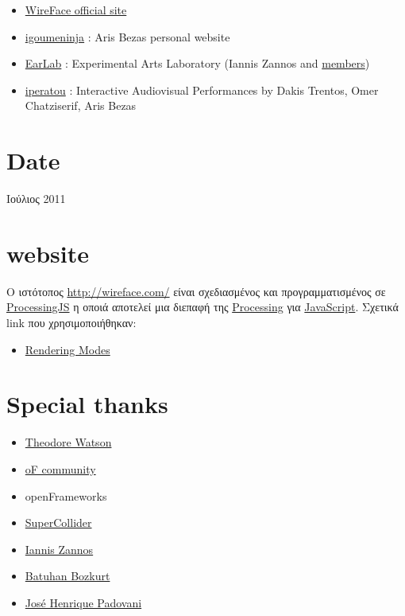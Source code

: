 \documentclass[11pt, a4paper]{scrartcl}
\begin{document}
\begin{itemize}
\item \href{http://wireface.com/}{WireFace official site}
\item \href{http://igoumeninja.org/}{igoumeninja} : Aris Bezas personal website
\item \href{http://earlab.org/}{EarLab} : Experimental Arts Laboratory (Iannis Zannos and \href{http://earlab.org/pmwiki.php?n=Members/HomePage}{members})
\item \href{http://iperatou.com/}{iperatou} : Interactive Audiovisual Performances by Dakis Trentos, Omer Chatziserif, Aris Bezas
\end{itemize}
\section{Date}
\label{sec-5}

Ιούλιος 2011
\section{website}
\label{sec-6}

Ο ιστότοπος \href{http://wireface.com/}{http://wireface.com/} είναι σχεδιασμένος και προγραμματισμένος σε \href{http://processingjs.org/}{ProcessingJS} η οποιά αποτελεί μια διεπαφή της \href{http://processing.org/}{Processing} για \href{http://en.wikipedia.org/wiki/JavaScript}{JavaScript}. 
Σχετικά link που χρησιμοποιήθηκαν:
\begin{itemize}
\item \href{http://processingjs.org/reference/articles/RenderingModes}{Rendering Modes}
\end{itemize}
\section{Special thanks}
\label{sec-7}

\begin{itemize}
\item \href{https://github.com/ofTheo/ofxKinect}{Theodore Watson}
\item \href{http://forum.openframeworks.cc/index.php?topic=4947.0}{oF community}
\item openFrameworks
\item \href{http://supercolliderbook.net/}{SuperCollider}
\item \href{http://earlab.org/}{Iannis Zannos}
\item \href{http://www.earslap.com/}{Batuhan Bozkurt}
\item \href{http://zepadovani.info}{José Henrique Padovani}
\end{itemize}
\end{document}
